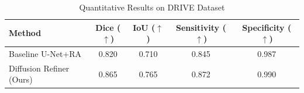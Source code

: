 \begin{table}[H]
    \centering
    \caption{Quantitative Results on DRIVE Dataset}
    \label{tab:drive_results}
    \begin{tabular}{lcccc}
        \toprule
        Method & Dice ($\uparrow$) & IoU ($\uparrow$) & Sensitivity ($\uparrow$) & Specificity ($\uparrow$) \\
        \midrule
        Baseline U-Net+RA & 0.820 & 0.710 & 0.845 & 0.987 \\
        Diffusion Refiner (Ours) & 0.865 & 0.765 & 0.872 & 0.990 \\
        \bottomrule
    \end{tabular}
\end{table}

